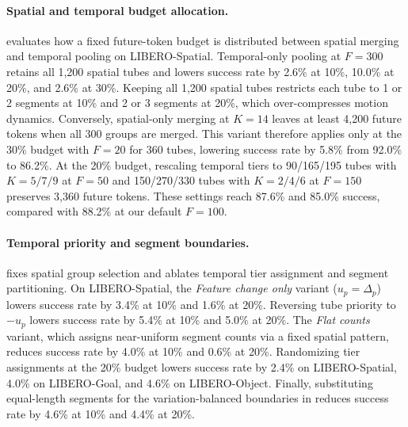 \paragraph{Spatial and temporal budget allocation.}
     evaluates how a fixed future-token budget is distributed between spatial merging and temporal pooling on LIBERO-Spatial.
    Temporal-only pooling at $F=300$ retains all 1,200 spatial tubes and lowers success rate by 2.6\% at 10\%, 10.0\% at 20\%, and 2.6\% at 30\%.
    Keeping all 1,200 spatial tubes restricts each tube to 1 or 2 segments at 10\% and 2 or 3 segments at 20\%, which over-compresses motion dynamics.
    Conversely, spatial-only merging at $K=14$ leaves at least 4,200 future tokens when all 300 groups are merged.
    This variant therefore applies only at the 30\% budget with $F=20$ for 360 tubes, lowering success rate by 5.8\% from 92.0\% to 86.2\%.
    At the 20\% budget, rescaling temporal tiers to 90/165/195 tubes with $K=5/7/9$ at $F=50$ and 150/270/330 tubes with $K=2/4/6$ at $F=150$ preserves 3,360 future tokens.
    These settings reach 87.6\% and 85.0\% success, compared with 88.2\% at our default $F=100$.




\paragraph{Temporal priority and segment boundaries.}
     fixes spatial group selection and ablates temporal tier assignment and segment partitioning.
    On LIBERO-Spatial, the \emph{Feature change only} variant ($u_p=\Delta_p$) lowers success rate by 3.4\% at 10\% and 1.6\% at 20\%.
    Reversing tube priority to $-u_p$ lowers success rate by 5.4\% at 10\% and 5.0\% at 20\%.
    The \emph{Flat counts} variant, which assigns near-uniform segment counts via a fixed spatial pattern, reduces success rate by 4.0\% at 10\% and 0.6\% at 20\%.
    Randomizing tier assignments at the 20\% budget lowers success rate by 2.4\% on LIBERO-Spatial, 4.0\% on LIBERO-Goal, and 4.6\% on LIBERO-Object.
    Finally, substituting equal-length segments for the variation-balanced boundaries in  reduces success rate by 4.6\% at 10\% and 4.4\% at 20\%.



